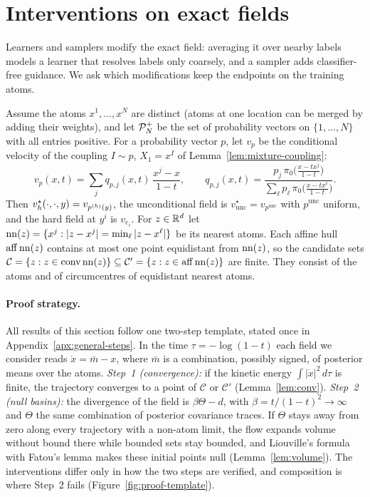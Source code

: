 \documentclass{article} %
\theoremstyle{plain}
\theoremstyle{definition}
\theoremstyle{remark}
\begin{document}
\section{Interventions on exact fields}
\label{sec:intervention-atomicity}

Learners and samplers modify the exact field: averaging it over nearby labels models a
learner that resolves labels only coarsely, and a sampler adds classifier-free guidance. We ask which
modifications keep the endpoints on the training atoms.

Assume the atoms $x^1,\dots,x^N$ are distinct (atoms at one location can be merged by adding
their weights), and let $\mathcal{P}_N^{+}$ be the set of probability vectors on $\{1,\dots,N\}$ with all
entries positive. For a probability vector $p$, let $v_p$ be the conditional velocity of the
coupling $I\sim p$, $X_1=x^I$ of Lemma~\ref{lem:mixture-coupling}:
\begin{equation}
v_p(x,t)=\sum_j q_{p,j}(x,t)\,\frac{x^j-x}{1-t},\qquad
q_{p,j}(x,t)=\frac{p_j\,\pi_0\big(\tfrac{x-tx^j}{1-t}\big)}
{\sum_\ell p_\ell\,\pi_0\big(\tfrac{x-tx^\ell}{1-t}\big)}.
\label{eq:prior-field}
\end{equation}
Then $v_h^\star(\cdot,\cdot,y)=v_{p^{(h)}(y)}$, the unconditional field is
$v_{\mathrm{unc}}^\star=v_{p^{\mathrm{unc}}}$ with $p^{\mathrm{unc}}$ uniform, and the hard field
at $y^i$ is $v_{e_i}$. For $z\in\mathbb{R}^d$ let $\operatorname{nn}(z)=\{x^j:|z-x^j|=\min_\ell|z-x^\ell|\}$ be its
nearest atoms. Each affine hull $\operatorname{aff}\operatorname{nn}(z)$ contains at most one point
equidistant from $\operatorname{nn}(z)$, so the candidate sets
$\mathcal C=\{z:z\in\operatorname{conv}\operatorname{nn}(z)\}\subseteq\mathcal C'=\{z:z\in\operatorname{aff}\operatorname{nn}(z)\}$
are finite. They consist of the atoms and of circumcentres of equidistant nearest atoms.

\paragraph{Proof strategy.} All results of this section follow one two-step template, stated once
in Appendix~\ref{apx:general-steps}. In the time $\tau=-\log(1-t)$ each field we consider reads
$\dot x=\bar m-x$, where $\bar m$ is a combination, possibly signed, of posterior means over the
atoms. \emph{Step~1 (convergence):} if the kinetic energy $\int|\dot x|^2\,d\tau$ is finite, the
trajectory converges to a point of $\mathcal C$ or $\mathcal C'$ (Lemma~\ref{lem:conv}).
\emph{Step~2 (null basins):} the divergence of the field is $\beta\Theta-d$, with
$\beta=t/(1-t)^2\to\infty$ and $\Theta$ the same combination of posterior covariance traces. If
$\Theta$ stays away from zero along every trajectory with a non-atom limit, the flow expands volume
without bound there while bounded sets stay bounded, and Liouville's formula with Fatou's lemma
makes these initial points null (Lemma~\ref{lem:volume}). The interventions differ only in how the
two steps are verified, and composition is where Step~2 fails (Figure~\ref{fig:proof-template}).
\end{document}
